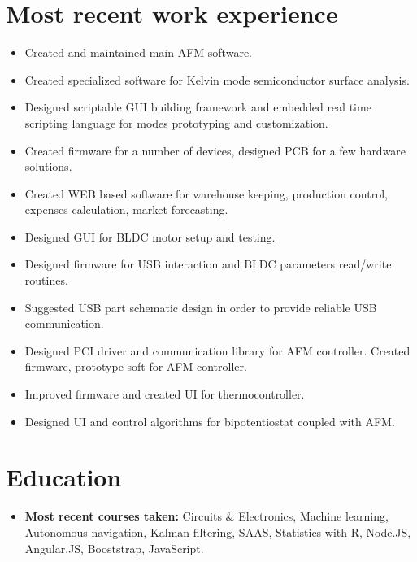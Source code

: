 \documentclass{sb_cv}
\begin{document}
\section{Most recent work experience}
\begin{itemize}
\item Created and maintained main AFM software.
\item Created specialized software for Kelvin mode semiconductor surface analysis.
\item Designed scriptable GUI building framework and embedded real time scripting language for modes prototyping and customization.
\item Created firmware for a number of devices, designed PCB for a few hardware solutions.
\item Created WEB based software for warehouse keeping, production control, expenses calculation, market forecasting.
\end{itemize}


\begin{itemize}
\item Designed GUI for BLDC motor setup and testing.
\item Designed firmware for USB interaction and BLDC parameters read/write routines.
\item Suggested USB part schematic design in order to provide reliable USB communication.
\end{itemize}

\begin{itemize}
\item Designed PCI driver and communication library for AFM controller. Created firmware, prototype soft for AFM controller.
\item Improved firmware and created UI for thermocontroller.
\item Designed UI and control algorithms for bipotentiostat coupled with AFM.
\end{itemize}


\section{Education}
\begin{itemize}
\item \textbf{Most recent courses taken:} Circuits \& Electronics, Machine learning, Autonomous navigation, Kalman filtering, SAAS, Statistics with R, Node.JS, Angular.JS, Booststrap, JavaScript.
\end{itemize}
\end{document}
